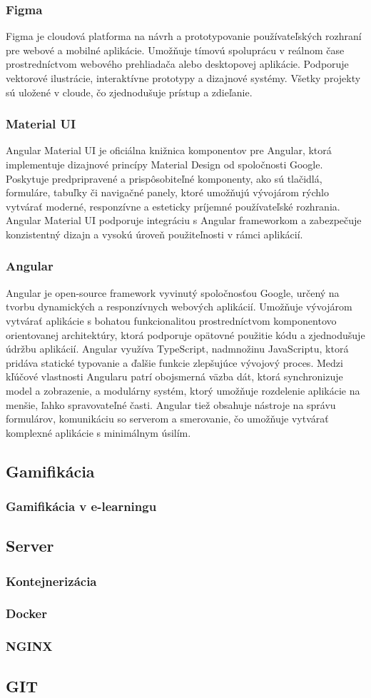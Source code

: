 \subsubsection{Figma}
Figma je cloudová platforma na návrh a prototypovanie používateľských rozhraní pre webové a mobilné aplikácie. 
Umožňuje tímovú spoluprácu v reálnom čase prostredníctvom webového prehliadača alebo desktopovej aplikácie. Podporuje vektorové ilustrácie, interaktívne prototypy a dizajnové systémy.
 Všetky projekty sú uložené v cloude, čo zjednodušuje prístup a zdieľanie. \cite{figma}
 \subsubsection{Material UI}
 Angular Material UI je oficiálna knižnica komponentov pre Angular, ktorá implementuje dizajnové princípy Material Design od spoločnosti Google. 
 Poskytuje predpripravené a prispôsobiteľné komponenty, ako sú tlačidlá, formuláre, tabuľky či navigačné panely, ktoré umožňujú vývojárom rýchlo vytvárať moderné, responzívne a esteticky príjemné používateľské rozhrania.
  Angular Material UI podporuje integráciu s Angular frameworkom a zabezpečuje konzistentný dizajn a vysokú úroveň použiteľnosti v rámci aplikácií. \cite{materialUI}
 \subsubsection{Angular}
 Angular je open-source framework vyvinutý spoločnosťou Google, určený na tvorbu dynamických a responzívnych webových aplikácií.
  Umožňuje vývojárom vytvárať aplikácie s bohatou funkcionalitou prostredníctvom komponentovo orientovanej architektúry, ktorá podporuje opätovné použitie kódu a zjednodušuje údržbu aplikácií.
   Angular využíva TypeScript, nadmnožinu JavaScriptu, ktorá pridáva statické typovanie a ďalšie funkcie zlepšujúce vývojový proces. 
   Medzi kľúčové vlastnosti Angularu patrí obojsmerná väzba dát, ktorá synchronizuje model a zobrazenie, a modulárny systém, ktorý umožňuje rozdelenie aplikácie na menšie, ľahko spravovateľné časti.
  Angular tiež obsahuje nástroje na správu formulárov, komunikáciu so serverom a smerovanie, čo umožňuje vytvárať komplexné aplikácie s minimálnym úsilím. \cite{angular}



\subsection{Gamifikácia}
\subsubsection{Gamifikácia v e-learningu}
\subsection{Server}
\subsubsection{Kontejnerizácia}
\subsubsection{Docker}
\subsubsection{NGINX}
\subsection{GIT}